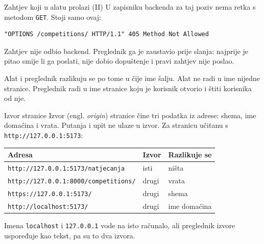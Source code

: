 \begin{frame}[fragile]{Zahtjev koji u alatu prolazi (II)}
U zapisniku backenda za taj poziv nema retka s metodom \texttt{GET}. Stoji samo ovaj:

\begin{lstlisting}
"OPTIONS /competitions/ HTTP/1.1" 405 Method Not Allowed
\end{lstlisting}

\vspace{0.5em}
Zahtjev nije odbio backend. Preglednik ga je zaustavio prije slanja: najprije je pitao smije li ga poslati, nije dobio dopuštenje i pravi zahtjev nije poslao.

\vspace{0.9em}
Alat i preglednik razlikuju se po tome u čije ime šalju. Alat ne radi u ime nijedne stranice. Preglednik radi u ime stranice koju je korisnik otvorio i štiti korisnika od nje.
\end{frame}


\begin{frame}{Izvor stranice}
Izvor (engl. \emph{origin}) stranice čine tri podatka iz adrese: shema, ime domaćina i vrata. Putanja i upit ne ulaze u izvor. Za stranicu učitanu s \texttt{http://127.0.0.1:5173}:

\vspace{0.7em}
\begin{center}
{\small
\setlength{\tabcolsep}{6pt}
\renewcommand{\arraystretch}{1.3}
\begin{tabular}{@{}L{6.9cm}L{1.6cm}L{2.6cm}@{}}
  \toprule
  \textbf{Adresa} & \textbf{Izvor} & \textbf{Razlikuje se} \\
  \midrule
  \texttt{http://127.0.0.1:5173/natjecanja} & isti & ništa \\
  \texttt{http://127.0.0.1:8000/competitions/} & drugi & vrata \\
  \texttt{https://127.0.0.1:5173/} & drugi & shema \\
  \texttt{http://localhost:5173/} & drugi & ime domaćina \\
  \bottomrule
\end{tabular}
}
\end{center}

\vspace{0.6em}
Imena \texttt{localhost} i \texttt{127.0.0.1} vode na isto računalo, ali preglednik izvore uspoređuje kao tekst, pa su to dva izvora.
\end{frame}

